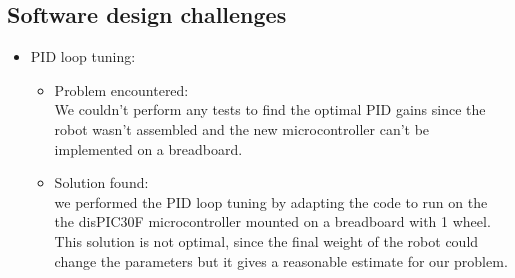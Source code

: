 
\subsection{Software design challenges}
\begin{itemize}
    \item PID loop tuning: 
     \begin{itemize}
      \item Problem encountered:\\
    We couldn’t perform any tests to find the optimal PID gains since the robot wasn’t assembled and the new microcontroller can’t be implemented on a breadboard. 
      \item Solution found:\\
    we performed the PID loop tuning by adapting the code to run on the the disPIC30F microcontroller mounted on a breadboard with 1 wheel. This solution is not optimal, since the final weight of the robot could change the parameters but it gives a reasonable estimate for our problem. 
        \end{itemize}
\end{itemize}

